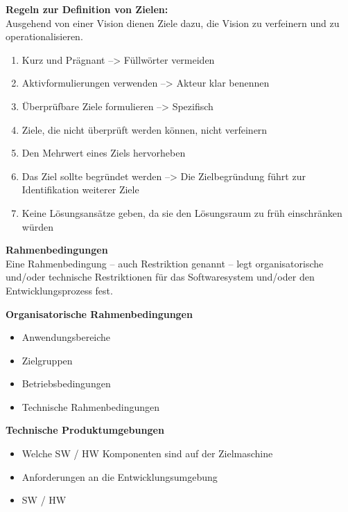 \textbf{Regeln zur Definition von Zielen:}\\
Ausgehend von einer Vision dienen Ziele dazu, die Vision zu verfeinern und zu operationalisieren.
\begin{enumerate}
	\item Kurz und Prägnant --> Füllwörter vermeiden
	\item Aktivformulierungen verwenden --> Akteur klar benennen
	\item Überprüfbare Ziele formulieren --> Spezifisch
	\item Ziele, die nicht überprüft werden können, nicht verfeinern
	\item Den Mehrwert eines Ziels hervorheben
	\item Das Ziel sollte begründet werden --> Die Zielbegründung führt zur Identifikation weiterer Ziele
	\item Keine Lösungsansätze geben, da sie den Lösungsraum zu früh einschränken würden
\end{enumerate}

\textbf{Rahmenbedingungen} \\
Eine Rahmenbedingung – auch Restriktion genannt – legt organisatorische und/oder technische Restriktionen für das Softwaresystem und/oder den Entwicklungsprozess fest. 
\begin{multicols}{2}
\textbf{Organisatorische Rahmenbedingungen}
\begin{itemize}
	\item Anwendungsbereiche
	\item Zielgruppen
	\item Betriebsbedingungen
	\item Technische Rahmenbedingungen
\end{itemize}
\columnbreak
\textbf{Technische Produktumgebungen}
\begin{itemize}
	\item Welche SW / HW Komponenten sind auf der Zielmaschine
	\item Anforderungen an die Entwicklungsumgebung
	\item SW / HW
\end{itemize}
\end{multicols}

